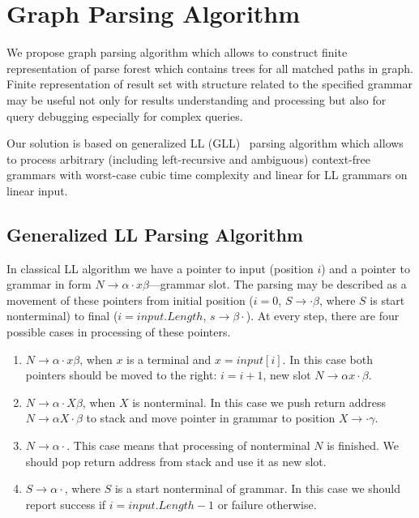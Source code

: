 \section{Graph Parsing Algorithm}

We propose graph parsing algorithm which allows to construct finite representation of parse forest which contains trees for all matched paths in graph.
Finite representation of result set with structure related to the specified grammar may be useful not only for results understanding and processing but also for query debugging especially for complex queries. 

Our solution is based on generalized LL (GLL)~\cite{scott2010gll, FastPracticalGLL} parsing algorithm which allows to process arbitrary (including left-recursive and ambiguous) context-free grammars with worst-case cubic time complexity and linear for LL grammars on linear input. 

\subsection{Generalized LL Parsing Algorithm}

In classical LL algorithm we have a pointer to input (position $i$) and a pointer to grammar in form $N \rightarrow \alpha \cdot x \beta $---grammar slot.
The parsing may be described as a movement of these pointers from initial position ($i = 0$, $S \rightarrow \cdot \beta $, where $S$ is start nonterminal) to final ($i = input.Length$, $s \rightarrow \beta \cdot$).
At every step, there are four possible cases in processing of these pointers. 

\begin{enumerate}
\item $N \rightarrow \alpha \cdot x \beta $, when $x$ is a terminal and $x = input[i]$. In this case both pointers should be moved to the right: $i = i + 1$, new slot $N \rightarrow \alpha  x \cdot \beta $.
\item $N \rightarrow \alpha \cdot X \beta $, when $X$ is nonterminal. In this case we push return address $N \rightarrow \alpha X \cdot \beta $ to stack and move pointer in grammar to position $X \rightarrow \cdot \gamma$.\label{itm:2}
\item $N \rightarrow \alpha \cdot $. This case means that processing of nonterminal $N$ is finished. We should pop return address from stack and use it as new slot.\label{itm:3}
\item $S \rightarrow \alpha \cdot $, where $S$ is a start nonterminal of grammar. In this case we should report success if $i = input.Length - 1$ or failure otherwise. 
\end{enumerate}

